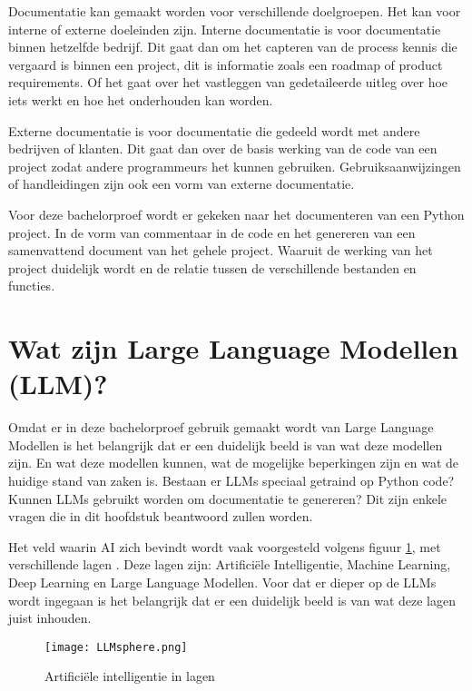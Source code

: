 Documentatie kan gemaakt worden voor verschillende doelgroepen. Het kan voor interne of externe doeleinden zijn.
Interne documentatie is voor documentatie binnen hetzelfde bedrijf.
Dit gaat dan om het capteren van de process kennis die vergaard is binnen een project, dit is informatie zoals een roadmap of product requirements. 
Of het gaat over het vastleggen van gedetaileerde uitleg over hoe iets werkt en hoe het onderhouden kan worden.

Externe documentatie is voor documentatie die gedeeld wordt met andere bedrijven of klanten. 
Dit gaat dan over de basis werking van de code van een project zodat andere programmeurs het kunnen gebruiken.
Gebruiksaanwijzingen of handleidingen zijn ook een vorm van externe documentatie. \autocite{swimm.io2024}

Voor deze bachelorproef wordt er gekeken naar het documenteren van een Python project.
In de vorm van commentaar in de code en het genereren van een samenvattend document van het gehele project.
Waaruit de werking van het project duidelijk wordt en de relatie tussen de verschillende bestanden en functies.

\section{Wat zijn Large Language Modellen (LLM)?}
\label{sec:wat-zijn-llms}

Omdat er in deze bachelorproef gebruik gemaakt wordt van Large Language Modellen is het belangrijk dat er een duidelijk beeld is van wat deze modellen zijn.
En wat deze modellen kunnen, wat de mogelijke beperkingen zijn en wat de huidige stand van zaken is. 
Bestaan er LLMs speciaal getraind op Python code? Kunnen LLMs gebruikt worden om documentatie te genereren? 
Dit zijn enkele vragen die in dit hoofdstuk beantwoord zullen worden. 

Het veld waarin AI zich bevindt wordt vaak voorgesteld volgens figuur \ref{fig:LLM-position}, met verschillende lagen \autocite{Stoeffelbauer2023}.
Deze lagen zijn: Artificiële Intelligentie, Machine Learning, Deep Learning en Large Language Modellen.
Voor dat er dieper op de LLMs wordt ingegaan is het belangrijk dat er een duidelijk beeld is van wat deze lagen juist inhouden.

\begin{figure}[h]
  \centering
  \texttt{[image: LLMsphere.png]}
  \caption{Artificiële intelligentie in lagen \autocite{Stoeffelbauer2023}}
  \label{fig:LLM-position}
\end{figure}

